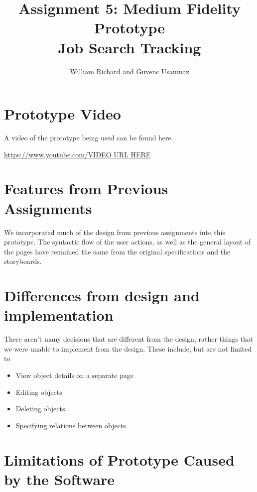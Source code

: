 \documentclass[12pt, letter]{article}
\title{Assignment 5: Medium Fidelity Prototype \\ Job Search Tracking}
\author{William Richard and Guvenc Usanmaz}
\begin{document}
\maketitle

\section{Prototype Video}
A video of the prototype being used can be found here.

\url{https://www.youtube.com/VIDEO URL HERE}

\section{Features from Previous Assignments}
We incorporated much of the design from previous assignments into this prototype.  The syntactic flow of the user actions, as well as the general layout of the pages have remained the same from the original specifications and the storyboards.

\section{Differences from design and implementation}
There aren't many decisions that are different from the design, rather things that we were unable to implement from the design.  These include, but are not limited to
\begin{itemize}
\item View object details on a separate page
\item Editing objects
\item Deleting objects
\item Specifying relations between objects
\end{itemize}

\section{Limitations of Prototype Caused by the Software}
\end{document}
